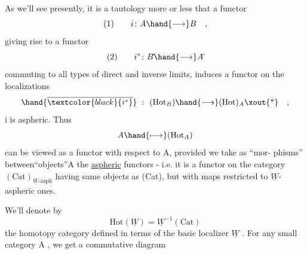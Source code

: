 As we'll see presently, it is a tautology more or less that a
functor
\[ \text{(1)} \qquad i\colon A \hand{\longrightarrow} B \quad , \]
giving rise to a functor
\[ \text{(2)} \qquad i^{*}\colon B\hat{} \hand{\longrightarrow} A\hat{} \]
\hand{(}commuting to all types of direct and inverse limits,\hand{)} induces a functor
on the localizations
\[ \hand{\overline{\textcolor{black}{i^{*}}}} \ : \ (\mathrm{Hot}_{B}) \hand{\longrightarrow} (\mathrm{Hot})_{A}\text{\xout{*}} \quad , \]
  i is  aspheric. Thus
\[ A \hand{\longmapsto} (\mathrm{Hot}_{A}) \]
can be viewed as a functor with respect to A, provided we take as ``mor-%
phisms'' between\allowbreak{}``objects''\allowbreak{}A the \uline{aspheric} functors  - i.e. it is a functor
on the category    $(\mathrm{Cat})_{\underline{W}\text{-asph}}$  having same objects as (Cat),
but with maps restricted to  $\underline{W}$-aspheric ones.

We'll denote by
\[ \mathrm{Hot}(\underline{W}) = \underline{W}^{-1}(\mathrm{Cat}) \]
the homotopy category defined in terms of the basic localizer $\underline{W}$ . For
any small category A , we get a commutative diagram

